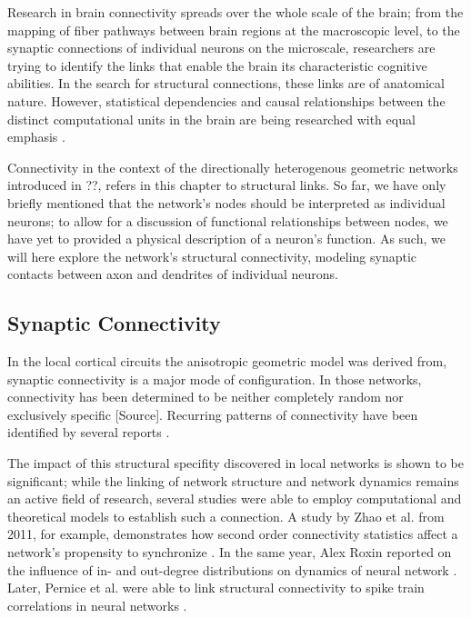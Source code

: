 Research in brain connectivity spreads over the whole scale  of the
brain; from the mapping of fiber pathways between brain regions at the
macroscopic level, to the synaptic connections of individual neurons
on the microscale, researchers are trying to identify the links that
enable the brain its characteristic cognitive abilities.
In the search for structural connections, these links are of
anatomical nature. However, statistical dependencies and causal
relationships between the distinct computational units in the brain
are being researched with equal emphasis \parencite{Scholarpedia-BrainConnectivity}.

Connectivity in the context of the directionally heterogenous
geometric networks introduced in ??, refers in this chapter to
structural links. So far, we have only briefly mentioned that the
network's nodes should be interpreted as individual neurons; to allow
for a discussion of functional relationships between nodes, we have yet
to provided a physical description of a neuron's function. As such, we
will here explore the network's structural connectivity, modeling
synaptic contacts between axon and dendrites of individual neurons.


\subsection*{Synaptic Connectivity}

In the local cortical circuits the anisotropic geometric model was
derived from, synaptic connectivity is a major mode of configuration.
In those networks, connectivity has been determined to be neither
completely random nor exclusively specific
[\textcolor{linkgrey}{Source}].%
Recurring patterns of connectivity have been identified by several
reports \cite{Sporns2004,Song2005,Perin2011}.

The impact of this structural specifity discovered in local networks
is shown to be significant; while the linking of network structure and
network dynamics remains an active field of research, several studies
were able to employ computational and theoretical models to establish
such a connection. A study by Zhao et al. from 2011, for example,
demonstrates how second order connectivity statistics affect a
network's propensity to synchronize
\cite{Zhao2011}. In the same year, Alex Roxin
reported on the influence of in- and out-degree distributions on
dynamics of neural network \cite{Roxin2011}. Later,
Pernice et al. were able to link structural connectivity to spike
train correlations in neural networks
\cite{Pernice2011}.


